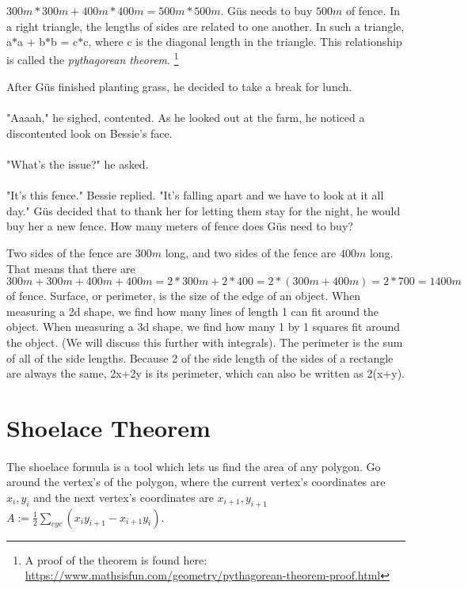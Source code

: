 {$300m\ast 300m + 400m\ast 400m = 500m\ast 500m$. G{\"u}s needs to buy $500m$ of fence.}
{In a right triangle, the lengths of sides are related to one another. In such a triangle, a$\ast$a + b$\ast$b = c$\ast$c, where c is the diagonal length in the triangle. This relationship is called the \textit{pythagorean theorem}. \footnote{A proof of the theorem is found here: \url{https://www.mathsisfun.com/geometry/pythagorean-theorem-proof.html}}}
{}
{After G{\"u}s finished planting grass, he decided to take a break for lunch. \paragraph{} "Aaaah," he sighed, contented. As he looked out at the farm, he noticed a discontented look on Bessie's face. \paragraph{}"What's the issue?" he asked. \paragraph{} "It's this fence." Bessie replied. "It's falling apart and we have to look at it all day." G{\"u}s decided that to thank her for letting them stay for the night, he would buy her a new fence. How many meters of fence does G{\"u}s need to buy?}
{Two sides of the fence are $300 m$ long, and two sides of the fence are $400 m$ long. That means that there are $300 m + 300 m + 400 m + 400 m = 2\ast 300 m+ 2\ast 400 = 2\ast(300 m + 400m) = 2\ast 700 = 1400 m$ of fence.}
{Surface, or perimeter, is the size of the edge of an object. When measuring a 2d shape, we find how many lines of length 1 can fit around the object. When measuring a 3d shape, we find how many 1 by 1 squares fit around the object. (We will discuss this further with integrals).
The perimeter is the sum of all of the side lengths. Because 2 of the side length of the sides of a rectangle are always the same, 2x+2y is its perimeter, which can also be written as 2(x+y).}
{}
\section{Shoelace Theorem}
\paragraph{} The shoelace formula is a tool which lets us find the area of any polygon. Go around the vertex's of the polygon, where the current vertex's coordinates are $x_i, y_i$ and the next vertex's coordinates are $x_{i+1}, y_{i+1}$ \linebreak
$A:={\frac{1}{2}}\sum_{cyc} (x_iy_{i+1}-x_{i+1}y_i)$.